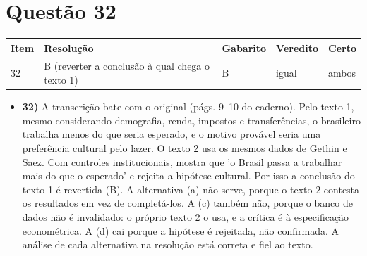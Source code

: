 \documentclass{article}%
\begin{document}
\section*{Questão 32}%
\begin{longtable}{@{}p{} p{} p{} p{} p{}@{}}\toprule Item & Resolução & Gabarito & Veredito & Certo \\ \midrule
32 & B (reverter a conclusão à qual chega o texto 1) & B & igual & ambos \\
\bottomrule\end{longtable}%
\begin{itemize}%
\item%
\textbf{32)} A transcrição bate com o original (págs. 9--10 do caderno). Pelo texto 1, mesmo considerando demografia, renda, impostos e transferências, o brasileiro trabalha menos do que seria esperado, e o motivo provável seria uma preferência cultural pelo lazer. O texto 2 usa os mesmos dados de Gethin e Saez. Com controles institucionais, mostra que 'o Brasil passa a trabalhar mais do que o esperado' e rejeita a hipótese cultural. Por isso a conclusão do texto 1 é revertida (B). A alternativa (a) não serve, porque o texto 2 contesta os resultados em vez de completá{-}los. A (c) também não, porque o banco de dados não é invalidado: o próprio texto 2 o usa, e a crítica é à especificação econométrica. A (d) cai porque a hipótese é rejeitada, não confirmada. A análise de cada alternativa na resolução está correta e fiel ao texto.%
\end{itemize}%
\end{document}
